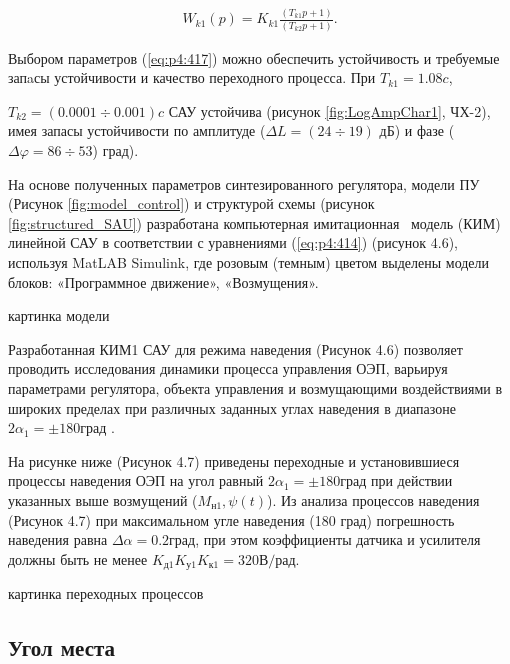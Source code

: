 \begin{equation}%
\label{eq:p4:417}
\begin{alignedat}{2}
W_{k1} \left( p \right) =K_{k1}\frac{ \left( T_{k1}p+1 \right) }{ \left( T_{k2}p+1 \right) }.
\end{alignedat}
\end{equation}

Выбором параметров (\ref{eq:p4:417}) можно обеспечить устойчивость и требуемые запaсы устойчивости и качество переходного процесса. При $T_{k1} = 1.08 c$, \par

$T_{k2} = (0.0001  \div 0.001) c$  САУ устойчива (рисунок \ref{fig:LogAmpChar1}, ЧХ-2), имея запасы устойчивости по амплитуде ($\varDelta L = (24 \div 19)$ дБ) и фазе ($\varDelta \varphi = 86 \div 53$) град).\par

На основе полученных параметров синтезированного регулятора, модели ПУ (Рисунок \ref{fig:model_control}) и структурой схемы (рисунок \ref{fig:structured_SAU}) разработана компьютерная имитационная \  модель (КИМ) линейной САУ в соответствии с уравнениями (\ref{eq:p4:414}) (рисунок 4.6), используя MatLAB Simulink, где розовым (темным) цветом выделены модели блоков: «Программное движение», «Возмущения». 

 картинка модели 

Разработанная КИМ1 САУ для режима наведения (Рисунок 4.6) позволяет проводить исследования динамики процесса управления ОЭП, варьируя параметрами регулятора, объекта управления и возмущающими воздействиями в широких пределах при различных заданных углах наведения в диапазоне  \( 2 \alpha _{1}= \pm 180 \textit{град} \) .\par

На рисунке ниже (Рисунок 4.7) приведены переходные и установившиеся процессы наведения ОЭП на угол равный \( 2 \alpha _{1}= \pm 180 \textit{град} \) при действии указанных выше возмущений ($M_{\textit{н1}}, \psi(t)$). Из анализа процессов наведения (Рисунок 4.7) при максимальном угле наведения (180 град) погрешность наведения равна $\Delta \alpha = 0.2 \textit{град}$, при этом коэффициенты датчика и усилителя должны быть не менее $K_{\textit{д1}} K_{\textit{у1}} K_{\textit{к1}} = 320 \textit{В/рад}$.

 картинка переходных процессов 






\subsection{Угол места} \label{ch:ch4/sect4-/sub2}

